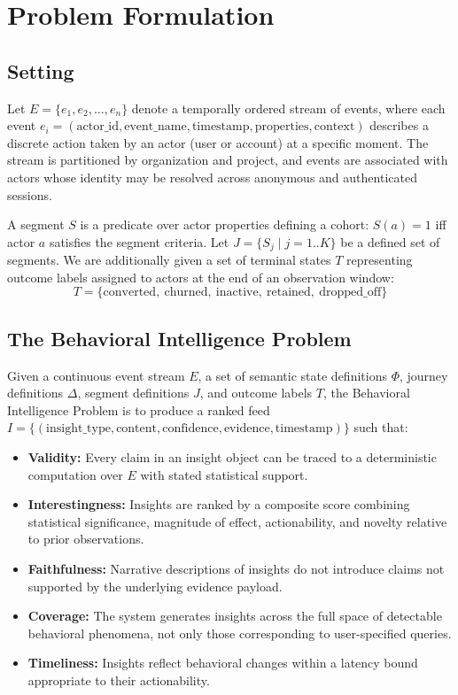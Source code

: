 \documentclass[12pt, a4paper]{article}
\begin{document}
\section{Problem Formulation}
\label{sec:problem}

\subsection{Setting}

Let $E = \{e_1, e_2, \ldots, e_n\}$ denote a temporally ordered stream of events, where each event $e_i = (\text{actor\_id}, \text{event\_name}, \text{timestamp}, \text{properties}, \text{context})$ describes a discrete action taken by an actor (user or account) at a specific moment. The stream is partitioned by organization and project, and events are associated with actors whose identity may be resolved across anonymous and authenticated sessions.

A segment $S$ is a predicate over actor properties defining a cohort: $S(a) = 1$ iff actor $a$ satisfies the segment criteria. Let $J = \{S_j \mid j = 1..K\}$ be a defined set of segments. We are additionally given a set of terminal states $T$ representing outcome labels assigned to actors at the end of an observation window:
\[
T = \{\text{converted},\ \text{churned},\ \text{inactive},\ \text{retained},\ \text{dropped\_off}\}
\]

\subsection{The Behavioral Intelligence Problem}

Given a continuous event stream $E$, a set of semantic state definitions $\Phi$, journey definitions $\Delta$, segment definitions $J$, and outcome labels $T$, the Behavioral Intelligence Problem is to produce a ranked feed $I = \{(\text{insight\_type}, \text{content}, \text{confidence}, \text{evidence}, \text{timestamp})\}$ such that:

\begin{itemize}[leftmargin=1.5em]
  \item \textbf{Validity:} Every claim in an insight object can be traced to a deterministic computation over $E$ with stated statistical support.
  \item \textbf{Interestingness:} Insights are ranked by a composite score combining statistical significance, magnitude of effect, actionability, and novelty relative to prior observations.
  \item \textbf{Faithfulness:} Narrative descriptions of insights do not introduce claims not supported by the underlying evidence payload.
  \item \textbf{Coverage:} The system generates insights across the full space of detectable behavioral phenomena, not only those corresponding to user-specified queries.
  \item \textbf{Timeliness:} Insights reflect behavioral changes within a latency bound appropriate to their actionability.
\end{itemize}
\end{document}
